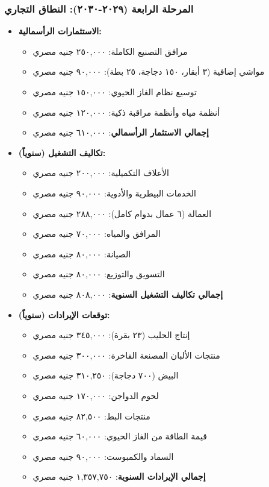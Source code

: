 \subsubsection{المرحلة الرابعة (٢٠٢٩-٢٠٣٠): النطاق التجاري}
\begin{itemize}
    \item \textbf{الاستثمارات الرأسمالية:}
    \begin{itemize}
        \item مرافق التصنيع الكاملة: ٢٥٠,٠٠٠ جنيه مصري
        \item مواشي إضافية (٣ أبقار، ١٥٠ دجاجة، ٢٥ بطة): ٩٠,٠٠٠ جنيه مصري
        \item توسيع نظام الغاز الحيوي: ١٥٠,٠٠٠ جنيه مصري
        \item أنظمة مياه وأنظمة مراقبة ذكية: ١٢٠,٠٠٠ جنيه مصري
        \item \textbf{إجمالي الاستثمار الرأسمالي}: ٦١٠,٠٠٠ جنيه مصري
    \end{itemize}
    
    \item \textbf{تكاليف التشغيل (سنوياً):}
    \begin{itemize}
        \item الأعلاف التكميلية: ٢٠٠,٠٠٠ جنيه مصري
        \item الخدمات البيطرية والأدوية: ٩٠,٠٠٠ جنيه مصري
        \item العمالة (٦ عمال بدوام كامل): ٢٨٨,٠٠٠ جنيه مصري
        \item المرافق والمياه: ٧٠,٠٠٠ جنيه مصري
        \item الصيانة: ٨٠,٠٠٠ جنيه مصري
        \item التسويق والتوزيع: ٨٠,٠٠٠ جنيه مصري
        \item \textbf{إجمالي تكاليف التشغيل السنوية}: ٨٠٨,٠٠٠ جنيه مصري
    \end{itemize}
    
    \item \textbf{توقعات الإيرادات (سنوياً):}
    \begin{itemize}
        \item إنتاج الحليب (٢٣ بقرة): ٣٤٥,٠٠٠ جنيه مصري
        \item منتجات الألبان المصنعة الفاخرة: ٣٠٠,٠٠٠ جنيه مصري
        \item البيض (٧٠٠ دجاجة): ٣١٠,٢٥٠ جنيه مصري
        \item لحوم الدواجن: ١٧٠,٠٠٠ جنيه مصري
        \item منتجات البط: ٨٢,٥٠٠ جنيه مصري
        \item قيمة الطاقة من الغاز الحيوي: ٦٠,٠٠٠ جنيه مصري
        \item السماد والكمبوست: ٩٠,٠٠٠ جنيه مصري
        \item \textbf{إجمالي الإيرادات السنوية}: ١,٣٥٧,٧٥٠ جنيه مصري
    \end{itemize}
    

\end{itemize}
